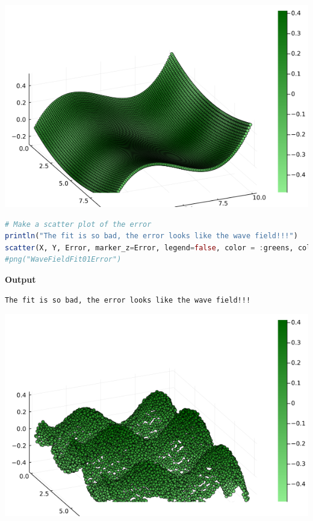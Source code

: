 \vspace*{.2cm}

\includegraphics[width=0.7\columnwidth]{graphics/Chap06/WaveFieldFit01.png}


\vspace*{.2cm}

\begin{lstlisting}[language=Julia,style=mystyle]
# Make a scatter plot of the error
println("The fit is so bad, the error looks like the wave field!!!")
scatter(X, Y, Error, marker_z=Error, legend=false, color = :greens, colorbar=true, camera=(-60, 60))
#png("WaveFieldFit01Error")
\end{lstlisting}
\textbf{Output} 
\begin{verbatim}
The fit is so bad, the error looks like the wave field!!!
\end{verbatim}


\vspace*{.2cm}

\includegraphics[width=0.7\columnwidth]{graphics/Chap06/WaveFieldFit01Error.png}

\vspace*{.2cm}

